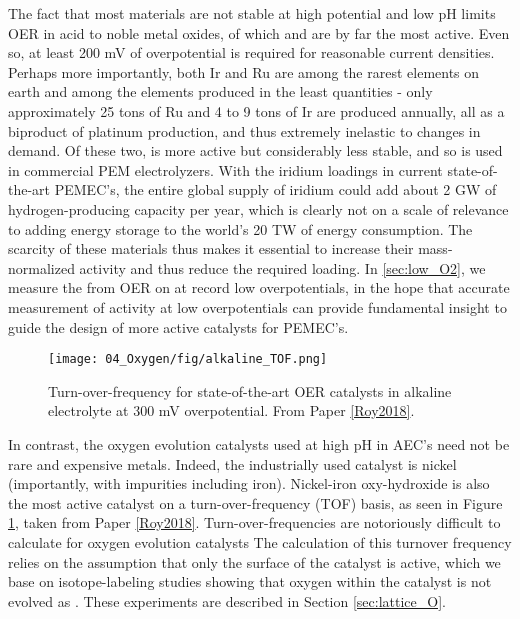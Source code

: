 The fact that most materials are not stable at high potential and low pH limits OER in acid to noble metal oxides, of which  and  are by far the most active\cite{Miles1976}. Even so, at least 200 mV of overpotential is required for reasonable current densities. Perhaps more importantly, both Ir and Ru are among the rarest elements on earth and among the elements produced in the least quantities - only approximately 25 tons of Ru\cite{Vesborg2012c} and 4\cite{Babic2017} to 9\cite{Vesborg2012c} tons of Ir are produced annually, all as a biproduct of platinum production, and thus extremely inelastic to changes in demand. Of these two,  is more active but considerably less stable, and so  is used in commercial PEM electrolyzers\cite{Carmo2013}. With the iridium loadings in current state-of-the-art PEMEC's, the entire global supply of iridium could add about 2 GW of hydrogen-producing capacity per year\cite{Babic2017}, which is clearly not on a scale of relevance to adding energy storage to the world's 20 TW of energy consumption\cite{Vesborg2012c}. The scarcity of these materials thus makes it essential to increase their mass-normalized activity and thus reduce the required loading. In \ref{sec:low_O2}, we measure the  from OER on  at record low overpotentials, in the hope that accurate measurement of activity at low overpotentials can provide fundamental insight to guide the design of more active catalysts for PEMEC's.

\begin{figure}[h]
	\texttt{[image: 04\_Oxygen/fig/alkaline\_TOF.png]}
	\caption{Turn-over-frequency for state-of-the-art OER catalysts in alkaline electrolyte at 300 mV overpotential. From Paper \ref{Roy2018}.}
	\label{fig:alkaline_TOF}
\end{figure}

In contrast, the oxygen evolution catalysts used at high pH in AEC's need not be rare and expensive metals. Indeed, the industrially used catalyst is nickel (importantly, with impurities including iron)\cite{LeRoy1979, Xiang2016, Trotochaud2014a}. Nickel-iron oxy-hydroxide is also the most active catalyst on a turn-over-frequency (TOF) basis, as seen in Figure \ref{fig:alkaline_TOF}, taken from Paper \ref{Roy2018}. Turn-over-frequencies are notoriously difficult to calculate for oxygen evolution catalysts The calculation of this turnover frequency relies on the assumption that only the surface of the catalyst is active, which we base on isotope-labeling studies showing that oxygen within the catalyst is not evolved as . These experiments are described in Section \ref{sec:lattice_O}. 

